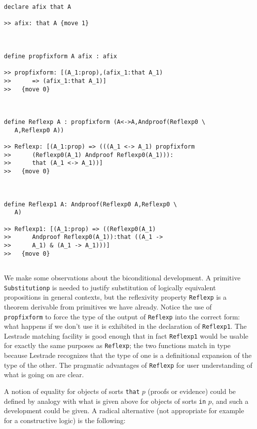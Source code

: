 \documentclass[12pt]{article}
\begin{document}
\begin{verbatim}
declare afix that A

>> afix: that A {move 1}



define propfixform A afix : afix

>> propfixform: [(A_1:prop),(afix_1:that A_1)
>>      => (afix_1:that A_1)]
>>   {move 0}



define Reflexp A : propfixform (A<->A,Andproof(Reflexp0 \
   A,Reflexp0 A))

>> Reflexp: [(A_1:prop) => (((A_1 <-> A_1) propfixform
>>      (Reflexp0(A_1) Andproof Reflexp0(A_1))):
>>      that (A_1 <-> A_1))]
>>   {move 0}



define Reflexp1 A: Andproof(Reflexp0 A,Reflexp0 \
   A)

>> Reflexp1: [(A_1:prop) => ((Reflexp0(A_1)
>>      Andproof Reflexp0(A_1)):that ((A_1 ->
>>      A_1) & (A_1 -> A_1)))]
>>   {move 0}


\end{verbatim}

We make some observations about the biconditional development.  A primitive {\tt Substitutionp} is needed to justify substitution of logically equivalent propositions in general contexts, but the reflexivity property {\tt Reflexp} is a theorem derivable from primitives we have already.  Notice the use of {\tt propfixform} to force the type of the output of {\tt Reflexp} into the correct form:  what happens if we don't use it is exhibited in  the declaration of {\tt Reflexp1}.  The Lestrade matching facility is good enough that in fact {\tt Reflexp1} would be usable for exactly the same purposes as {\tt Reflexp};  the two functions match in type because Lestrade recognizes that the type of one is a definitional expansion of the type of the other.  The pragmatic advantages of {\tt Reflexp} for user understanding of what is going on are clear.

A notion of equality for objects of sorts {\tt that} $p$ (proofs or evidence) could be defined by analogy with what is given above for objects of sorts
{\tt in} $p$, and such a development could be given.  A radical alternative (not appropriate for example for a constructive logic) is the following:
\end{document}
